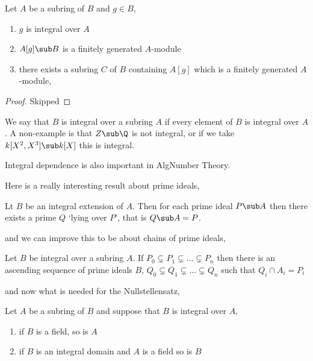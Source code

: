 
\begin{nlemma}
  Let $A$ be a subring of $B$ and $g \in B$,
  \begin{enumerate}
    \item $g$ is integral over $A$
    \item $A[g] \sub B$ is a finitely generated $A$-module
    \item there exists a subring $C$ of $B$ containing $A[g]$ which is a finitely generated $A$-module,
  \end{enumerate}
\end{nlemma}
\begin{proof}
  Skipped
\end{proof}

\noindent
We say that $B$ is integral over a subring $A$ if every element of $B$ is integral over $A$. A non-example is that $Z \sub \Q$ is not integral, or if we take $k[X^2, X^3] \sub k[X]$ this is integral.

\begin{remark}
   Integral dependence is also important in AlgNumber Theory.
\end{remark}

Here is a really interesting result about prime ideals,
\begin{nprop}
  Lt $B$ be an integral extension of $A$. Then for each prime ideal $P \sub A$ then there exists a prime $Q$ `lying over $P$', that is $Q\sub A = P$.
\end{nprop}
and we can improve this to be about chains of prime ideals,
\begin{nprop}
 Let $B$ be integral over a subring $A$. If $P_0 \subsetneq P_1 \subsetneq \dots \subsetneq P_n$ then there is an ascending sequence of prime ideals $B$, $Q_0 \subsetneq Q_1 \subsetneq \dots \subsetneq Q_n$ such that $Q_i \cap A_i = P_i$
\end{nprop}

\noindent
and now what is needed for the Nullstellensatz,
\begin{ncor}
   Let $A$ be a subring of $B$ and suppose that $B$ is integral over $A$,
   \begin{enumerate}
     \item if $B$ is a field, so is $A$
     \item if $B$ is an integral domain and $A$ is a field so is $B$
   \end{enumerate}
\end{ncor}

